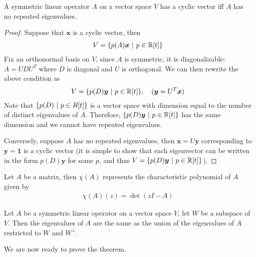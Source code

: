 \documentclass{math}
\renewcommand{\vec}[1]{\boldsymbol{#1}}
\begin{document}
\begin{lemma}
    A symmetric linear operator $A$ on a vector space $V$ has a cyclic vector iff $A$ has no repeated eigenvalues.
\end{lemma}
\begin{proof}
    Suppose that $\vec{x}$ is a cyclic vector, then
    \begin{align*}
        V = \setc{p(A)\vec{x}}{p \in \mathbb{R}[t]}
    \end{align*}
    Fix an orthonormal basis on $V$, since $A$ is symmetric, it is diagonalizable: $A = UDU^T$ where $D$ is diagonal and $U$ is orthogonal.
    We can then rewrite the above condition as
    \begin{align*}
        V = \setc{p(D)\vec{y}}{p \in \mathbb{R}[t]}, \quad (\vec{y} = U^T\vec{x})
    \end{align*}
    Note that $\{ p(D) \ | \ p \in R[t] \}$ is a vector space with dimension equal to the number of distinct eigenvalues of $A$.
    Therefore, $\setc{p(D)\vec{y}}{p \in \mathbb{R}[t]}$ has the same dimension and we cannot have repeated eigenvalues.

    Conversely, suppose $A$ has no repeated eigenvalues, then $\vec{x} = U \vec{y}$ corresponding to $\vec{y} = \vec{1}$ is a cyclic vector
    (it is simple to show that each eigenvector can be written in the form $p(D)\vec{y}$ for some $p$, and thus $V = \setc{p(D)\vec{y}}{p \in \mathbb{R}[t]}$).
\end{proof}

\begin{definition}
    Let $A$ be a matrix, then $\chi(A)$ represents the characteristic polynomial of $A$ given by
    \begin{align*}
        \chi(A)(z) = \det(zI - A)
    \end{align*}
\end{definition}

\begin{lemma}
    Let $A$ be a symmetric linear operator on a vector space $V$, let $W$ be a subspace of $V$.
    Then the eigenvalues of $A$ are the same as the union of the eigenvalues of $A$ restricted to $W$ and $W^\perp$.
\end{lemma}

We are now ready to prove the theorem.
\end{document}
